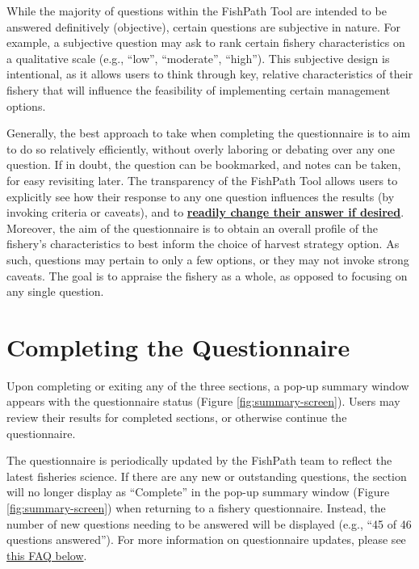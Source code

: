 \documentclass[
  11pt,
]{book}
\begin{document}
While the majority of questions within the FishPath Tool are intended to be answered definitively (objective), certain questions are subjective in nature. For example, a subjective question may ask to rank certain fishery characteristics on a qualitative scale (e.g., ``low'', ``moderate'', ``high''). This subjective design is intentional, as it allows users to think through key, relative characteristics of their fishery that will influence the feasibility of implementing certain management options.

Generally, the best approach to take when completing the questionnaire is to aim to do so relatively efficiently, without overly laboring or debating over any one question. If in doubt, the question can be bookmarked, and notes can be taken, for easy revisiting later. The transparency of the FishPath Tool allows users to explicitly see how their response to any one question influences the results (by invoking criteria or caveats), and to \protect\hyperlink{bookmarked-questions-and-influential-answers}{\textbf{readily change their answer if desired}}. Moreover, the aim of the questionnaire is to obtain an overall profile of the fishery's characteristics to best inform the choice of harvest strategy option. As such, questions may pertain to only a few options, or they may not invoke strong caveats. The goal is to appraise the fishery as a whole, as opposed to focusing on any single question.

\hypertarget{completing-the-questionnaire}{%
\section{Completing the Questionnaire}\label{completing-the-questionnaire}}

Upon completing or exiting any of the three sections, a pop-up summary window appears with the questionnaire status (Figure \ref{fig:summary-screen}). Users may review their results for completed sections, or otherwise continue the questionnaire.

The questionnaire is periodically updated by the FishPath team to reflect the latest fisheries science. If there are any new or outstanding questions, the section will no longer display as ``Complete'' in the pop-up summary window (Figure \ref{fig:summary-screen}) when returning to a fishery questionnaire. Instead, the number of new questions needing to be answered will be displayed (e.g., ``45 of 46 questions answered''). For more information on questionnaire updates, please see \protect\hyperlink{faq-content-updates}{this FAQ below}.
\end{document}
